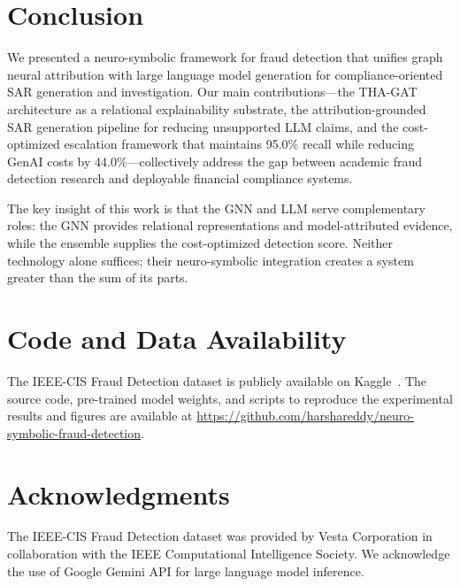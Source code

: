 \documentclass[journal]{IEEEtran}
\begin{document}
\section{Conclusion}

We presented a neuro-symbolic framework for fraud detection that unifies graph neural attribution with large language model generation for compliance-oriented SAR generation and investigation. Our main contributions---the THA-GAT architecture as a relational explainability substrate, the attribution-grounded SAR generation pipeline for reducing unsupported LLM claims, and the cost-optimized escalation framework that maintains 95.0\% recall while reducing GenAI costs by 44.0\%---collectively address the gap between academic fraud detection research and deployable financial compliance systems.

The key insight of this work is that the GNN and LLM serve complementary roles: the GNN provides relational representations and model-attributed evidence, while the ensemble supplies the cost-optimized detection score. Neither technology alone suffices; their neuro-symbolic integration creates a system greater than the sum of its parts.

\section*{Code and Data Availability}
The IEEE-CIS Fraud Detection dataset is publicly available on Kaggle~\cite{ieee_cis}. The source code, pre-trained model weights, and scripts to reproduce the experimental results and figures are available at \url{https://github.com/harshareddy/neuro-symbolic-fraud-detection}. 

\section*{Acknowledgments}
The IEEE-CIS Fraud Detection dataset was provided by Vesta Corporation in collaboration with the IEEE Computational Intelligence Society. We acknowledge the use of Google Gemini API for large language model inference.
\end{document}

